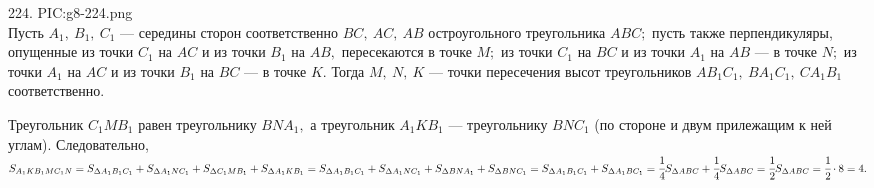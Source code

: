 224. {{PIC:g8-224.png}}\\
Пусть $A_1,\ B_1,\ C_1$ --- середины сторон соответственно $BC,\ AC,\ AB$ остроугольного треугольника $ABC;$ пусть также перпендикуляры, опущенные из точки $C_1$ на $AC$ и из точки $B_1$ на $AB,$ пересекаются в точке $M;$ из точки $C_1$ на $BC$ и из точки $A_1$ на $AB$ --- в точке $N;$ из точки $A_1$ на $AC$ и из точки $B_1$ на $BC$ --- в точке $K.$ Тогда $M,\ N,\ K$ --- точки пересечения высот треугольников $AB_1C_1,\ BA_1C_1,\ CA_1B_1$ соответственно.

Треугольник $C_1MB_1$ равен треугольнику $BNA_1,$ а треугольник $A_1KB_1$ --- треугольнику $BNC_1$ (по стороне и двум прилежащим к ней углам). Следовательно,
$S_{A_1KB_1MC_1N} = S_{\Delta A_1B_1C_1} + S_{\Delta A_1NC_1} + S_{\Delta C_1MB_1} + S_{\Delta A_1KB_1}
= S_{\Delta A_1B_1C_1} + S_{\Delta A_1NC_1} + S_{\Delta BNA_1} + S_{\Delta BNC_1}
= S_{\Delta A_1B_1C_1} + S_{\Delta A_1BC_1} = \cfrac{1}{4}S_{\Delta ABC} + \cfrac{1}{4}S_{\Delta ABC} = \cfrac{1}{2}S_{\Delta ABC}=\cfrac{1}{2}\cdot 8=4.$\\
